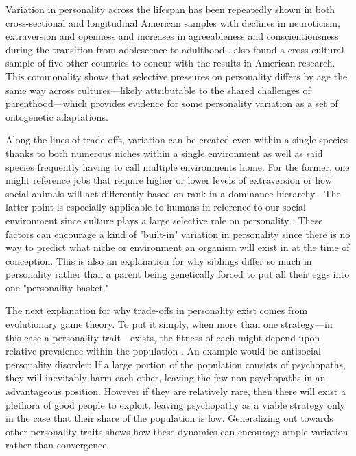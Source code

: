 \documentclass[a4paper, 12pt]{article}
\begin{document}
Variation in personality across the lifespan has been repeatedly shown in both cross-sectional and longitudinal American samples with declines in neuroticism, extraversion and openness and increases in agreeableness and conscientiousness during the transition from adolescence to adulthood \cite{fiveCultures1999}. 
\citeauthor{fiveCultures1999} also found a cross-cultural sample of five other countries to concur with the results in American research. This commonality shows that selective pressures on personality differs by age the same way across cultures---likely attributable to the shared challenges of parenthood---which provides evidence for some personality variation as a set of ontogenetic adaptations. \par

Along the lines of trade-offs, variation can be created even within a single species thanks to both numerous niches within a single environment as well as said species frequently having to call multiple environments home. For the former, one might reference jobs that require higher or lower levels of extraversion or how social animals will act differently based on rank in a dominance hierarchy \cite{rainbow2011, lobster1997}. The latter point is especially applicable to humans in reference to our social environment since culture plays a large selective role on personality \cite{cultureClash2006}. These factors can encourage a kind of "built-in" variation in personality since there is no way to predict what niche or environment an organism will exist in at the time of conception. This is also an explanation for why siblings differ so much in personality rather than a parent being genetically forced to put all their eggs into one "personality basket." \par

The next explanation for why trade-offs in personality exist comes from evolutionary game theory. To put it simply, when more than one strategy---in this case a personality trait---exists, the fitness of each might depend upon relative prevalence within the population \cite{gameTheory1999}. An example would be antisocial personality disorder: If a large portion of the population consists of psychopaths, they will inevitably harm each other, leaving the few non-psychopaths in an advantageous position. However if they are relatively rare, then there will exist a plethora of good people to exploit, leaving psychopathy as a viable strategy only in the case that their share of the population is low. Generalizing out towards other personality traits shows how these dynamics can encourage ample variation rather than convergence. \par
\end{document}
